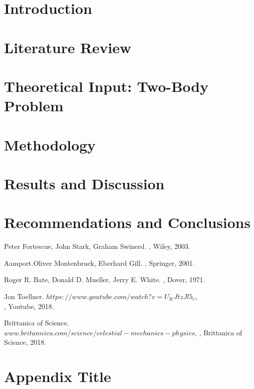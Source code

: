 \documentclass[12pt,twoside]{report}
\begin{document}
\listoffigures

\listoftables

\chapter{Introduction}


\chapter{Literature Review}


\chapter{Theoretical Input: Two-Body Problem}


\chapter{Methodology}


\chapter{Results and Discussion}


\chapter{Recommendations and Conclusions}


\begin{thebibliography}{1}
	
	Peter Fortescue, John Stark, Graham Swinerd.
	, Wiley, 2003.
	
	Aamport.Oliver Montenbruck, Eberhard Gill.
	, Springer, 2001.
	
	Roger R. Bate, Donald D. Mueller, Jerry E. White.
	, Dover, 1971.
	
	Jon Toellner.
	\newblock \(https://www.youtube.com/watch?v=U_KJtzJl5_c \),\\
	, Youtube, 2018.
	
	Brittanica of Science.
	\newblock \(www.britannica.com/science/celestial-mechanics-physics\),
	, Brittanica of Science, 2018.    
	
	
\end{thebibliography}

\appendix
\chapter{Appendix Title}

\end{document}
